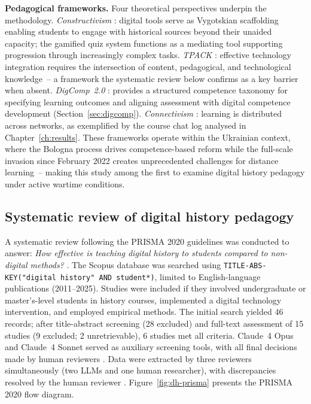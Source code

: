 \textbf{Pedagogical frameworks.} \label{subsec:dh-frameworks}
Four theoretical perspectives underpin the methodology. \textit{Constructivism} \cite{Vygotsky1978}: digital tools serve as Vygotskian scaffolding enabling students to engage with historical sources beyond their unaided capacity; the gamified quiz system functions as a mediating tool supporting progression through increasingly complex tasks. \textit{TPACK} \cite{Mishra2006, Koehler2013}: effective technology integration requires the intersection of content, pedagogical, and technological knowledge~-- a framework the systematic review below confirms as a key barrier when absent. \textit{DigComp~2.0} \cite{Vuorikari2016}: provides a structured competence taxonomy for specifying learning outcomes and aligning assessment with digital competence development (Section~\ref{sec:digcomp}). \textit{Connectivism} \cite{Siemens2004}: learning is distributed across networks, as exemplified by the course chat log analysed in Chapter~\ref{ch:results}. These frameworks operate within the Ukrainian context, where the Bologna process drives competence-based reform \cite{UNESCO2023} while the full-scale invasion since February 2022 creates unprecedented challenges for distance learning~-- making this study among the first to examine digital history pedagogy under active wartime conditions.

\subsection{Systematic review of digital history pedagogy} \label{subsec:dh-systematic}

A systematic review following the PRISMA 2020 guidelines \citep{Page2021} was conducted to answer: \textit{How effective is teaching digital history to students compared to non-digital methods?} \cite{KorniienkoSemerikov2024}. The Scopus database was searched using \texttt{TITLE-ABS-KEY("digital history" AND student*)}, limited to English-language publications (2011--2025). Studies were included if they involved undergraduate or master's-level students in history courses, implemented a digital technology intervention, and employed empirical methods. The initial search yielded 46 records; after title-abstract screening (28 excluded) and full-text assessment of 15 studies (9 excluded; 2 unretrievable), 6 studies met all criteria. Claude~4 Opus and Claude~4 Sonnet served as auxiliary screening tools, with all final decisions made by human reviewers \cite{MalekiKarami2024, Taneri2025}. Data were extracted by three reviewers simultaneously (two LLMs and one human researcher), with discrepancies resolved by the human reviewer \cite{Rubinstein2025}. Figure~\ref{fig:dh-prisma} presents the PRISMA 2020 flow diagram.

